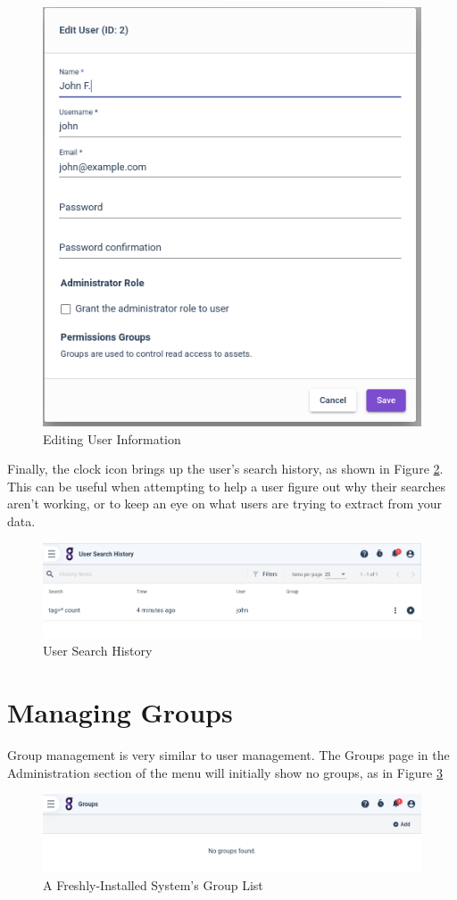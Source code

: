 \begin{figure}
	\includegraphics[width=0.55\linewidth]{images/edituser.png}
	\caption{Editing User Information}
	\label{fig:edituser}
\end{figure}

Finally, the clock icon brings up the user's search history, as shown in Figure \ref{fig:userhistory}.
This can be useful when attempting to help a user figure out why their searches
aren't working, or to keep an eye on what users are trying to extract
from your data.

\begin{figure}
	\includegraphics[width=0.9\linewidth]{images/userhistory.png}
	\caption{User Search History}
	\label{fig:userhistory}
\end{figure}

\section{Managing Groups}
Group management is very similar to user management. The Groups page in
the Administration section of the menu will initially show no groups, as in
Figure \ref{fig:fresh-groups}

\begin{figure}[H]
	\includegraphics{images/empty-groups.png}
	\caption{A Freshly-Installed System's Group List}
	\label{fig:fresh-groups}
\end{figure}

